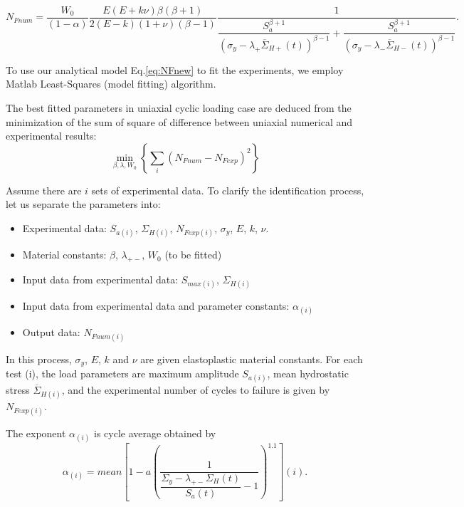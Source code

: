 \begin{equation}N_{Fnum}=\dfrac{W_0}{\left( 1-\alpha\right) }\dfrac{E(E+k\nu)\beta\left( \beta+1\right) }{ 2(E-k)(1+\nu)\left( \beta-1\right) }\dfrac{1}{\dfrac{S_{a}^{\beta+1}}{\left(\sigma_y-\lambda_+\overline{\Sigma}_{H+}(t)\right)^{\beta-1}}+\dfrac{S_{a}^{\beta+1}}{\left(\sigma_y-\lambda_-\overline{\Sigma}_{H-}(t)\right)^{\beta-1}}}.\label{eq:NFnew}
\end{equation}


To use our analytical model Eq.\eqref{eq:NFnew} to fit the experiments, we employ Matlab Least-Squares (model fitting) algorithm. 

The best fitted parameters in uniaxial cyclic loading case are deduced from the minimization of the sum of square of difference between uniaxial numerical and experimental results:
\begin{equation}
\min_{\beta,\lambda,W_0}\left\lbrace \sum_{i}\left(N_{Fnum}-N_{Fexp} \right)^2\right\rbrace 
\label{eq.leastsquares}
\end{equation}

Assume there are $i$ sets of experimental data. To clarify the identification process, let us separate the parameters into:
\begin{itemize}
	\item Experimental data: $S_{a(i)}$, $\Sigma_{H(i)}$, $N_{Fexp(i)}$, $\sigma_y$, $E$, $k$, $\nu$.
	\item Material constants: $\beta$, $\lambda_{+-}$, $W_0$ (to be fitted)
	\item Input data from experimental data: $S_{max(i)}$, $\Sigma_{H(i)}$
	\item Input data from experimental data and parameter constants: $\alpha_{(i)}$
	\item Output data: $N_{Fnum(i)}$
\end{itemize}

In this process, $\sigma_y$, $E$, $k$ and $\nu$ are given elastoplastic material constants. For each test (i), the load parameters are maximum amplitude $S_{a(i)}$, mean hydrostatic stress $\overline{\Sigma}_{H(i)}$, and the experimental number of cycles to failure is given by $N_{Fexp(i)}$.

The exponent $\alpha_{(i)}$ is cycle average obtained by
\begin{equation}
\alpha_{(i)}=mean\left[1-a\left( \dfrac{1}{\dfrac{\Sigma_y-\lambda_{+-} \Sigma_{H}(t)}{S_{a}(t)}-1 } \right)^{1.1}\right] (i).
\label{eq.meanalp}
\end{equation}

